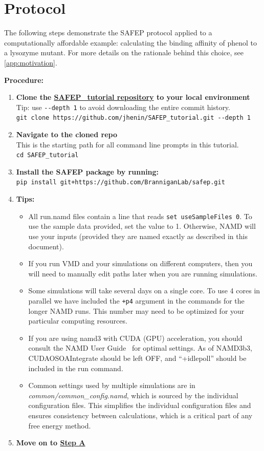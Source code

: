 \documentclass[9pt,tutorial]{Styling/livecoms}
\newcommand{\filepath}[1]{\textit{#1}}
\newcommand{\textInput}[1]{\texttt{#1}}
\begin{document}
\section{Protocol} \label{sec:protocol}
\vspace{0.5em}

The following steps demonstrate the SAFEP protocol applied to a computationally affordable example: calculating the binding affinity of phenol to a lysozyme mutant.
For more details on the rationale behind this choice, see \ref{app:motivation}.

\textbf{Procedure:}
\begin{enumerate}
    \item \textbf{Clone the \href{https://github.com/jhenin/SAFEP_tutorial}{SAFEP\_tutorial repository} to your local environment} Tip: use \textInput{-{}-depth 1} to avoid downloading the entire commit history. \\
    \textInput{git clone https://github.com/jhenin/SAFEP\_tutorial.git -{}-depth 1}
    \item \textbf{Navigate to the cloned repo}\\
    This is the starting path for all command line prompts in this tutorial. \\
    \textInput{cd SAFEP\_tutorial}
    \item \textbf{Install the SAFEP package by running:}\\
    \textInput{pip install git+https://github.com/BranniganLab/safep.git}
    \item \textbf{Tips:} 
    \begin{itemize}
    \item All run.namd files contain a line that reads \textInput{set useSampleFiles 0}. To use the sample data provided, set the value to 1. Otherwise, NAMD will use your inputs (provided they are named exactly as described in this document).
    \item If you run VMD and your simulations on different computers, then you will need to manually edit paths later when you are running simulations. 
    \item Some simulations will take several days on a single core. To use 4 cores in parallel we have included the \textInput{+p4} argument in the commands for the longer NAMD runs. This number may need to be optimized for your particular computing resources.
    \item If you are using namd3 with CUDA (GPU) acceleration, you should consult the NAMD User Guide~\cite{Bernardi2020} for optimal settings. As of NAMD3b3, CUDAOSOAIntegrate should be left OFF, and ``+idlepoll'' should be included in the run command.
    \item Common settings used by multiple simulations are in \filepath{common/common\_config.namd}, which is sourced by the individual configuration files. This simplifies the individual configuration files and ensures consistency between calculations, which is a critical part of any free energy method.
    \end{itemize}
    \item \textbf{Move on to \hyperref[step:equilibrium]{Step A}}
\end{enumerate}
\end{document}

